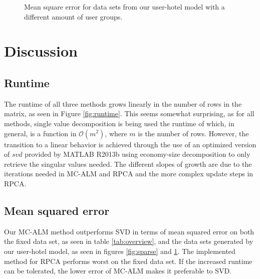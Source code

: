 \documentclass[10pt,conference,compsocconf]{IEEEtran}
\begin{document}
\begin{figure}
\caption{Mean square error for data sets from our user-hotel model with a different amount of user groups.}
\label{fig:usergroups}
\end{figure}


\section{Discussion}

\subsection{Runtime}
The runtime of all three methods grows linearly in the number of rows in the
matrix, as seen in Figure \ref{fig:runtime}. This seems somewhat surprising, as
for all methods, single value decomposition is being used the runtime of which,
in general, is a function in $\mathcal{O}(m^2)$, where $m$ is the number of
rows. However, the transition to a linear behavior is achieved through the use
of an optimized version of $svd$ provided by MATLAB R2013b using economy-size decomposition to only retrieve the singular values
needed. The different slopes of growth are due to the iterations needed in
MC-ALM and RPCA and the more complex update steps in RPCA.

\subsection{Mean squared error}
Our MC-ALM method outperforms SVD in terms of mean squared error on both the
fixed data set, as seen in table \ref{tab:overview}, and the data sets
generated by our user-hotel model, as seen in figures \ref{fig:sparse} and
\ref{fig:usergroups}. The implemented method for RPCA performs worst on the
fixed data set. If the increased runtime can be tolerated, the lower error of
MC-ALM makes it preferable to SVD.
\\
\end{document}

